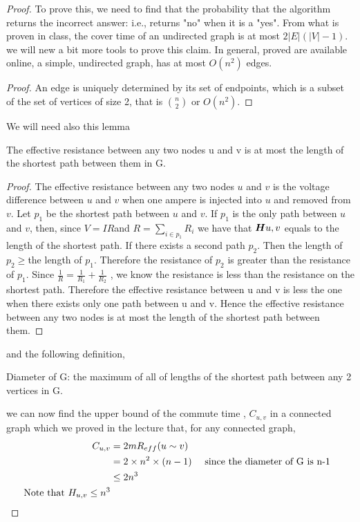 \documentclass[a4paper, 11pt]{article}
\begin{document}
\begin{proof}
To prove this, we need to find that the probability that the algorithm returns the incorrect answer: i.e., returns "no" when it is a "yes". From what is proven in class, the cover time  of an undirected graph is at most $2|E|(|V| − 1)$. we will new a bit more tools to prove this claim. In general, proved are available online, a simple, undirected  graph, has at most $O(n^2)$ edges.  
\begin{proof}
An edge is uniquely determined by its set of endpoints, which is a subset of the set of vertices of size 2, that is ${ n} \choose {2}$ or $O(n^2)$. 
\end{proof}
We will need also this lemma 
\begin{lemma}
 The effective resistance between any two nodes u and v is at most the length of the shortest path between them in G.
 \end{lemma}
 \begin{proof}
 The effective resistance between any two nodes $u$ and $v$ is the voltage difference  between $u$ and $v$ when
one ampere is injected into $u$ and removed from $v$. Let $p_1$ be the shortest path between $u$ and $v$. If $p_1$ is the only
path between $u$ and $v$, then, since $V =  IR$and $ R = \sum_{ i \in p_1} R_i $ we have that ${\boldsymbol H}{u,v} $ equals to the length of the shortest path. If there exists a second path $p_2$. Then the length of $p_2 \geq $the length of $p_1$. Therefore the resistance of $p_2$ is
greater than the resistance of $p_1$. Since $\frac{1}{R} = \frac{1}{R_1} + \frac{1}{R_2}$ , we know the resistance is less than the resistance on the 
shortest path. Therefore the effective resistance between u and v is less the one when there exists only one path between u and v. Hence the effective resistance between any two nodes is at most the length of the shortest path between them. 
\end{proof}
and the following definition,
\begin{definition}
Diameter of G: the maximum of all of lengths of the shortest path between any 2 vertices in G.
\end{definition}
we can now find the upper bound of the commute time , $C_{u,v}$ in a connected graph which we proved in the lecture that, for any connected graph, 
\begin{align*}
C_{u,v} &= 2mR_{eff}( u \sim v)\\
&= 2\times n^2 \times (n-1) && \textmd{ since the diameter of G is n-1} \\ 
& \leq 2n^3\\
\textmd{ Note that } H_{u,v} \leq  n^3
\end{align*}


\end{proof}
\end{document}
